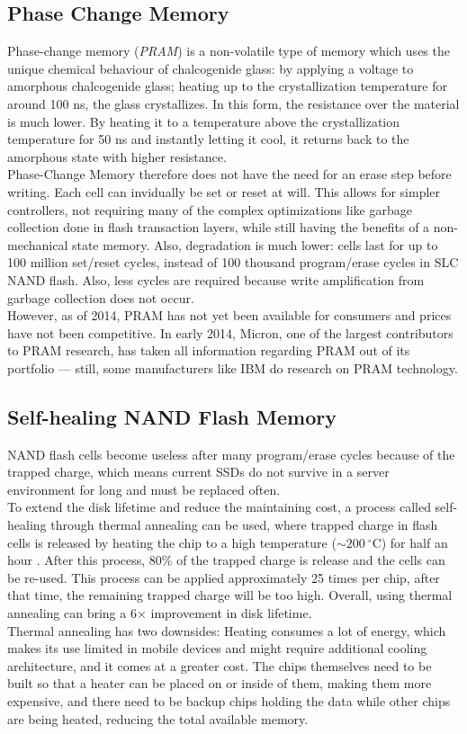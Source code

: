\documentclass{acm_proc_article-sp}
\begin{document}
\subsection{Phase Change Memory}
Phase-change memory (\emph{PRAM}) is a non-volatile type of memory which uses the unique chemical behaviour of chalcogenide glass: by applying a voltage to amorphous chalcogenide glass; heating up to the crystallization temperature for around 100 ns, the glass crystallizes. In this form, the resistance over the material is much lower. By heating it to a temperature above the crystallization temperature for 50 ns and instantly letting it cool, it returns back to the amorphous state with higher resistance.
\\
Phase-Change Memory therefore does not have the need for an erase step before writing. Each cell can invidually be set or reset at will. This allows for simpler controllers, not requiring many of the complex optimizations like garbage collection done in flash transaction layers, while still having the benefits of a non-mechanical state memory. Also, degradation is much lower: cells last for up to 100 million set/reset cycles, instead of 100 thousand program/erase cycles in SLC NAND flash. Also, less cycles are required because write amplification from garbage collection does not occur.
\\
However, as of 2014, PRAM has not yet been available for consumers and prices have not been competitive. In early 2014, Micron, one of the largest contributors to PRAM research, has taken all information regarding PRAM out of its portfolio --- still, some manufacturers like IBM do research on PRAM technology.

\subsection{Self-healing NAND Flash Memory}
NAND flash cells become useless after many program/erase cycles because of the trapped charge, which means current SSDs do not survive in a server environment for long and must be replaced often.
\\
To extend the disk lifetime and reduce the maintaining cost, a process called self-healing through thermal annealing can be used, where trapped charge in flash cells is released by heating the chip to a high temperature ($\sim 200~^{\circ}$C) for half an hour \cite{wu2011exploiting}. After this process, 80\% of the trapped charge is release and the cells can be re-used. This process can be applied approximately 25 times per chip, after that time, the remaining trapped charge will be too high. Overall, using thermal annealing can bring a 6$\times$ improvement in disk lifetime.
\\
Thermal annealing has two downsides: Heating consumes a lot of energy, which makes its use limited in mobile devices and might require additional cooling architecture, and it comes at a greater cost. The chips themselves need to be built so that a heater can be placed on or inside of them, making them more expensive, and there need to be backup chips holding the data while other chips are being heated, reducing the total available memory.
\end{document}
